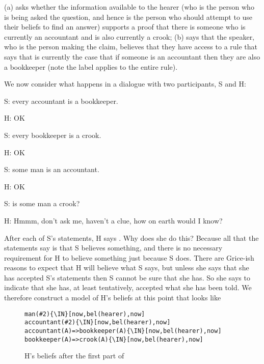 \documentclass[11pt,a4paper]{article}
\newcommand{\IN}{$\in$}
\begin{document}
\noindent
{}(a) asks whether the information available to the hearer
(who is the person who is being asked the question, and hence is the
person who should attempt to use their beliefs to find an answer) supports a
proof that there is someone who is currently an accountant and is also
currently a crook; (b) says that the speaker, who is the
person making the claim, believes that they have access to a rule that
says that is currently the case that if someone is an accountant then
they are also a bookkeeper (note the label applies to the entire
rule).

We now consider what happens in a dialogue with two participants, S and H:

\begin{examples}
\item\label{DIALOGUE:1}
S: every accountant is a bookkeeper.

H: OK

S: every bookkeeper is a crook.

H: OK

S: some man is an accountant.

H: OK

S: is some man a crook?

H: Hmmm, don't ask me, haven't a clue, how on earth would I know?
\end{examples}

After each of S's statements, H says . Why does she do
this? Because all that the statements say is that S believes
something, and there is no necessary requirement for H to believe
something just because S does. There are Grice-ish reasons to expect
that H will believe what S says, but unless she says that she has
accepted S's statements then S cannot be sure that she has. So she
says  to indicate that she has, at least tentatively, accepted
what she has been told. We therefore construct a model of H's beliefs
at this point that looks like 


\begin{figure}[ht]
\begin{center}
\begin{minipage}[t]{0.45\linewidth}
\begin{Verbatim}[commandchars=\\\{\}]
man(#2){\IN}[now,bel(hearer),now]
accountant(#2){\IN}[now,bel(hearer),now]
accountant(A)=>bookkeeper(A){\IN}[now,bel(hearer),now]
bookkeeper(A)=>crook(A){\IN}[now,bel(hearer),now]
\end{Verbatim}
\end{minipage}
\end{center}
\caption{H's beliefs after the first part of }\label{FIG:DIALOGUE:1:a}
\end{figure}
\end{document}
